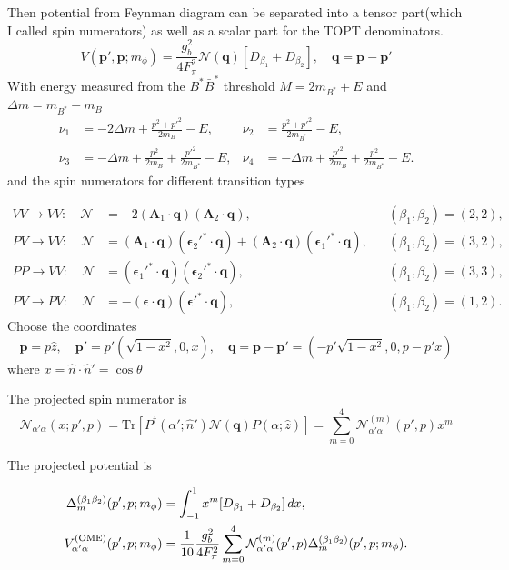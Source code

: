 \documentclass[aps,prl,showpacs,amsmath,onecolumn,superscriptaddress,floatfix,nofootinbib,notitlepage]{revtex4-2}
\newcommand{\vep}{{\bm p}}
\newcommand{\veq}{{\bm q}}
\newcommand{\be}{\begin{equation}}
\newcommand{\ee}{\end{equation}}
\begin{document}
Then potential from Feynman diagram can be separated into a tensor part(which I called spin numerators) as well as a scalar part for the TOPT denominators.
\be
V(\vep',\vep;m_\phi)=\frac{g_b^2}{4F_\pi^2}\mathcal{N}(\veq)[D_{\beta_1}+D_{\beta_2}], \quad \veq = \vep-\vep'
\ee
With energy measured from the $B^*\bar{B}^*$ threshold $M = 2m_{B^*}+E$ and $\Delta m = m_{B^*} - m_B$
\be
\begin{aligned}
	\nu_1 & =-2\Delta m+\frac{p^2+p'^2}{2m_B}-E,                 &
	\nu_2 & =\frac{p^2+p'^2}{2m_{B^*}}-E,                          \\
	\nu_3 & =-\Delta m+\frac{p^2}{2m_B}+\frac{p'^2}{2m_{B^*}}-E, &
	\nu_4 & =-\Delta m+\frac{p'^2}{2m_B}+\frac{p^2}{2m_{B^*}}-E.
\end{aligned}
\ee
and the spin numerators for different transition types

\begin{align}
	VV\to VV:\quad \mathcal N & =-2(\bm A_1\cdot\bm q)(\bm A_2\cdot\bm q),
	                          &                                                            & (\beta_1,\beta_2)=(2,2),\label{eq:spin-vv}     \\
	PV\to VV:\quad \mathcal N & =(\bm A_1\cdot\bm q)(\bm\epsilon_2'^*\cdot\bm q)
	+(\bm A_2\cdot\bm q)(\bm\epsilon_1'^*\cdot\bm q),
	                          &                                                            & (\beta_1,\beta_2)=(3,2),\label{eq:spin-pvv}    \\
	PP\to VV:\quad \mathcal N & =(\bm\epsilon_1'^*\cdot\bm q)(\bm\epsilon_2'^*\cdot\bm q),
	                          &                                                            & (\beta_1,\beta_2)=(3,3),\label{eq:ome-bb-bsbs} \\
	PV\to PV:\quad \mathcal N & =-(\bm\epsilon\cdot\bm q)(\bm\epsilon'^*\cdot\bm q),
	                          &                                                            & (\beta_1,\beta_2)=(1,2).\label{eq:spin-pv}
\end{align}
Choose the coordinates
\be
\vep = p\hat{z},\quad \vep' = p'(\sqrt{1-x^2}, 0, x),\quad \veq = \vep-\vep' = (-p'\sqrt{1-x^2}, 0, p - p'x)
\ee
where $x = \hat{n}\cdot\hat{n}' = \cos\theta$

The projected spin numerator is
\be
\mathcal{N}_{\alpha'\alpha}(x;p',p) = \text{Tr}\left[P^\dagger(\alpha';\hat{n}')\mathcal{N}(\veq)P(\alpha;\hat{z})\right] = \sum_{m=0}^{4}\mathcal{N}_{\alpha'\alpha}^{(m)}(p',p)x^m
\ee

The projected potential is

\be
\begin{aligned}
	\Delta_m^{(\beta_1\beta_2)}(p',p;m_\phi)
	 & =\int_{-1}^{1}x^m[D_{\beta_1}+D_{\beta_2}]\,dx,
	\\
	V^{\rm(OME)}_{\alpha'\alpha}(p',p;m_\phi)
	 & =\frac1{10}\frac{g_b^2}{4F_\pi^2}\sum_{m=0}^4
	\mathcal N^{(m)}_{\alpha'\alpha}(p',p)
	\Delta_m^{(\beta_1\beta_2)}(p',p;m_\phi).
\end{aligned}
\ee
\end{document}
